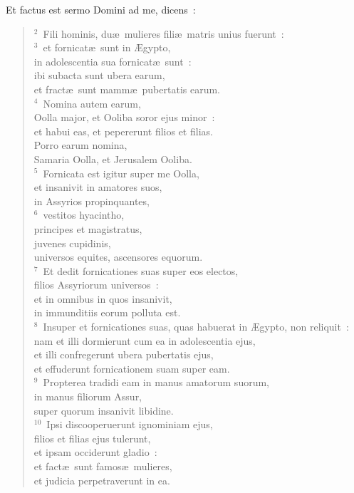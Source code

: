 \bchapter
\lettrine[lines=3,image=true,loversize=0.05,lraise=-0.03]{E}{}t factus est sermo Domini ad me, dicens~:
\begin{flushleft}\begin{verse}\vspace{6pt}${}^{2}$~Fili hominis, du\ae\ mulieres fili\ae\ matris unius fuerunt~:\\
${}^{3}$~et fornicat\ae\ sunt in \AE gypto,\\ in adolescentia sua fornicat\ae\ sunt~:\\ ibi subacta sunt ubera earum,\\ et fract\ae\ sunt mamm\ae\ pubertatis earum.\\
${}^{4}$~Nomina autem earum,\\ Oolla major, et Ooliba soror ejus minor~:\\ et habui eas, et pepererunt filios et filias.\\ Porro earum nomina,\\ Samaria Oolla, et Jerusalem Ooliba.\\
${}^{5}$~Fornicata est igitur super me Oolla,\\ et insanivit in amatores suos,\\ in Assyrios propinquantes,\\
${}^{6}$~vestitos hyacintho,\\ principes et magistratus,\\ juvenes cupidinis,\\ universos equites, ascensores equorum.\\
${}^{7}$~Et dedit fornicationes suas super eos electos,\\ filios Assyriorum universos~:\\ et in omnibus in quos insanivit,\\ in immunditiis eorum polluta est.\\
${}^{8}$~Insuper et fornicationes suas, quas habuerat in \AE gypto, non reliquit~:\\ nam et illi dormierunt cum ea in adolescentia ejus,\\ et illi confregerunt ubera pubertatis ejus,\\ et effuderunt fornicationem suam super eam.\\
${}^{9}$~Propterea tradidi eam in manus amatorum suorum,\\ in manus filiorum Assur,\\ super quorum insanivit libidine.\\
${}^{10}$~Ipsi discooperuerunt ignominiam ejus,\\ filios et filias ejus tulerunt,\\ et ipsam occiderunt gladio~:\\ et fact\ae\ sunt famos\ae\ mulieres,\\ et judicia perpetraverunt in ea.\\

\end{verse}
\end{flushleft}
